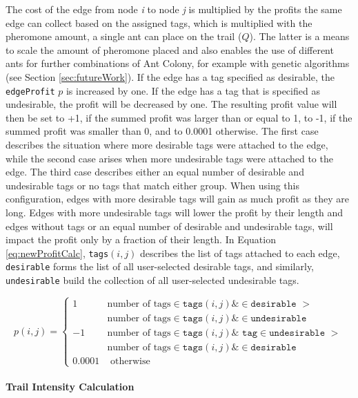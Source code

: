 The cost of the edge from node \textit{i} to node \textit{j} is multiplied by the profits the same edge can collect based on the assigned tags, which is multiplied with the pheromone amount, a single ant can place on the trail ($Q$).
The latter is a means to scale the amount of pheromone placed and also enables the use of different ants for further combinations of Ant Colony, for example with genetic algorithms (see Section \ref{sec:futureWork}).
If the edge has a tag specified as desirable, the \texttt{edgeProfit} $p$ is increased by one.
If the edge has a tag that is specified as undesirable, the profit will be decreased by one.
The resulting profit value will then be set to +1, if the summed profit was larger than or equal to 1, to -1, if the summed profit was smaller than 0, and to 0.0001 otherwise.
The first case describes the situation where more desirable tags were attached to the edge, while the second case arises when more undesirable tags were attached to the edge.
The third case describes either an equal number of desirable and undesirable tags or no tags that match either group.
When using this configuration, edges with more desirable tags will gain as much profit as they are long. 
Edges with more undesirable tags will lower the profit by their length and edges without tags or an equal number of desirable and undesirable tags, will impact the profit only by a fraction of their length.
In Equation \ref{eq:newProfitCalc}, \texttt{tags}$(i,j)$ describes the list of tags attached to each edge, \texttt{desirable} forms the list of all user-selected desirable tags, and similarly, \texttt{undesirable} build the collection of all user-selected undesirable tags.

\begin{equation}
	\label{eq:newProfitCalc}
	p(i,j) = \begin{cases}
		1 & \text{number of tags} \in \texttt{tags}(i,j) \& \in \texttt{desirable } >\\
		  & \text{number of tags} \in \texttt{tags}(i,j) \& \in\texttt{undesirable }\\
		-1 &\text{number of tags} \in \texttt{tags}(i,j) \& \texttt{ tag} \in \texttt{undesirable } > \\
		 & \text{number of tags} \in \texttt{tags}(i,j) \& \in\texttt{desirable }\\
		0.0001 &\text{ otherwise}
	\end{cases}
\end{equation}


\paragraph{Trail Intensity Calculation}


